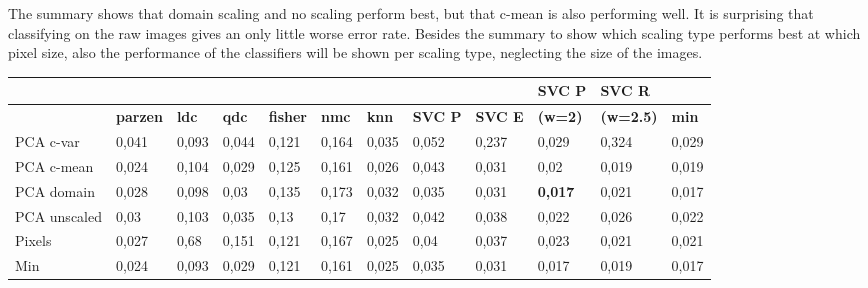 \documentclass{article}
\begin{document}
The summary shows that domain scaling and no scaling perform best, but that c-mean is also performing well. It is surprising that classifying on the raw images gives an only little worse error rate. Besides the summary to show which scaling type performs best at which pixel size, also the performance of the classifiers will be shown per scaling type, neglecting the size of the images. 

\begin{table}[H]
  \small
  \centering
    \begin{tabular}{l|llllllllll|l|}
    \hline
     & & & & & & & &  & \textbf{SVC P} & \textbf{SVC R} &  \\
    \hline
          & \multicolumn{1}{l}{\textbf{parzen}} & \multicolumn{1}{l}{\textbf{ldc}} & \multicolumn{1}{l}{\textbf{qdc}} & \multicolumn{1}{l}{\textbf{fisher}} & \multicolumn{1}{l}{\textbf{nmc}} & \multicolumn{1}{l}{\textbf{knn}} & \multicolumn{1}{l}{\textbf{SVC P}} & \multicolumn{1}{l}{\textbf{SVC E}} & \textbf{(w=2)} & \textbf{(w=2.5)} & \multicolumn{1}{l}{\textbf{min}} \\ \hline
    PCA c-var & \multicolumn{1}{l}{0,041} & \multicolumn{1}{l}{0,093} & \multicolumn{1}{l}{0,044} & \multicolumn{1}{l}{0,121} & \multicolumn{1}{l}{0,164} & \multicolumn{1}{l}{0,035} & \multicolumn{1}{l}{0,052} & \multicolumn{1}{l}{0,237} & 0,029 & 0,324 & \multicolumn{1}{l}{0,029} \\
    PCA c-mean & \multicolumn{1}{l}{0,024} & \multicolumn{1}{l}{0,104} & \multicolumn{1}{l}{0,029} & \multicolumn{1}{l}{0,125} & \multicolumn{1}{l}{0,161} & \multicolumn{1}{l}{0,026} & \multicolumn{1}{l}{0,043} & \multicolumn{1}{l}{0,031} & 0,02  & 0,019 & \multicolumn{1}{l}{0,019} \\
    PCA domain & \multicolumn{1}{l}{0,028} & \multicolumn{1}{l}{0,098} & \multicolumn{1}{l}{0,03} & \multicolumn{1}{l}{0,135} & \multicolumn{1}{l}{0,173} & \multicolumn{1}{l}{0,032} & \multicolumn{1}{l}{0,035} & \multicolumn{1}{l}{0,031} & \textbf{0,017} & 0,021 & \multicolumn{1}{l}{0,017} \\
    PCA unscaled & \multicolumn{1}{l}{0,03} & \multicolumn{1}{l}{0,103} & \multicolumn{1}{l}{0,035} & \multicolumn{1}{l}{0,13} & \multicolumn{1}{l}{0,17} & \multicolumn{1}{l}{0,032} & \multicolumn{1}{l}{0,042} & \multicolumn{1}{l}{0,038} & 0,022 & 0,026 & \multicolumn{1}{l}{0,022} \\
    Pixels & \multicolumn{1}{l}{0,027} & \multicolumn{1}{l}{0,68} & \multicolumn{1}{l}{0,151} & \multicolumn{1}{l}{0,121} & \multicolumn{1}{l}{0,167} & \multicolumn{1}{l}{0,025} & \multicolumn{1}{l}{0,04} & \multicolumn{1}{l}{0,037} & 0,023 & 0,021 & \multicolumn{1}{l}{0,021} \\ \hline
    Min   & \multicolumn{1}{l}{0,024} & \multicolumn{1}{l}{0,093} & \multicolumn{1}{l}{0,029} & \multicolumn{1}{l}{0,121} & \multicolumn{1}{l}{0,161} & \multicolumn{1}{l}{0,025} & \multicolumn{1}{l}{0,035} & \multicolumn{1}{l}{0,031} & 0,017 & 0,019 & \multicolumn{1}{l}{0,017} \\
    \hline
    \end{tabular}%


\end{table}
\end{document}
